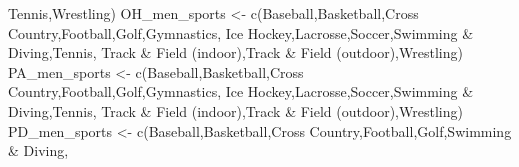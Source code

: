 \documentclass[
]{article}
\newenvironment{Shaded}{\begin{snugshade}}{\end{snugshade}}
\newcommand{\FunctionTok}[1]{\textcolor[rgb]{0.00,0.00,0.00}{#1}}
\newcommand{\NormalTok}[1]{#1}
\newcommand{\OtherTok}[1]{\textcolor[rgb]{0.56,0.35,0.01}{#1}}
\newcommand{\StringTok}[1]{\textcolor[rgb]{0.31,0.60,0.02}{#1}}
\begin{document}
\begin{Shaded}
\begin{Highlighting}[]
                   \StringTok{\textquotesingle{}Tennis\textquotesingle{}}\NormalTok{,}\StringTok{\textquotesingle{}Wrestling\textquotesingle{}}\NormalTok{)}
\NormalTok{OH\_men\_sports }\OtherTok{\textless{}{-}} \FunctionTok{c}\NormalTok{(}\StringTok{\textquotesingle{}Baseball\textquotesingle{}}\NormalTok{,}\StringTok{\textquotesingle{}Basketball\textquotesingle{}}\NormalTok{,}\StringTok{\textquotesingle{}Cross Country\textquotesingle{}}\NormalTok{,}\StringTok{\textquotesingle{}Football\textquotesingle{}}\NormalTok{,}\StringTok{\textquotesingle{}Golf\textquotesingle{}}\NormalTok{,}\StringTok{\textquotesingle{}Gymnastics\textquotesingle{}}\NormalTok{,}
                   \StringTok{\textquotesingle{}Ice Hockey\textquotesingle{}}\NormalTok{,}\StringTok{\textquotesingle{}Lacrosse\textquotesingle{}}\NormalTok{,}\StringTok{\textquotesingle{}Soccer\textquotesingle{}}\NormalTok{,}\StringTok{\textquotesingle{}Swimming \& Diving\textquotesingle{}}\NormalTok{,}\StringTok{\textquotesingle{}Tennis\textquotesingle{}}\NormalTok{,}
                   \StringTok{\textquotesingle{}Track \& Field (indoor)\textquotesingle{}}\NormalTok{,}\StringTok{\textquotesingle{}Track \& Field (outdoor)\textquotesingle{}}\NormalTok{,}\StringTok{\textquotesingle{}Wrestling\textquotesingle{}}\NormalTok{)}
\NormalTok{PA\_men\_sports }\OtherTok{\textless{}{-}} \FunctionTok{c}\NormalTok{(}\StringTok{\textquotesingle{}Baseball\textquotesingle{}}\NormalTok{,}\StringTok{\textquotesingle{}Basketball\textquotesingle{}}\NormalTok{,}\StringTok{\textquotesingle{}Cross Country\textquotesingle{}}\NormalTok{,}\StringTok{\textquotesingle{}Football\textquotesingle{}}\NormalTok{,}\StringTok{\textquotesingle{}Golf\textquotesingle{}}\NormalTok{,}\StringTok{\textquotesingle{}Gymnastics\textquotesingle{}}\NormalTok{,}
                   \StringTok{\textquotesingle{}Ice Hockey\textquotesingle{}}\NormalTok{,}\StringTok{\textquotesingle{}Lacrosse\textquotesingle{}}\NormalTok{,}\StringTok{\textquotesingle{}Soccer\textquotesingle{}}\NormalTok{,}\StringTok{\textquotesingle{}Swimming \& Diving\textquotesingle{}}\NormalTok{,}\StringTok{\textquotesingle{}Tennis\textquotesingle{}}\NormalTok{,}
                   \StringTok{\textquotesingle{}Track \& Field (indoor)\textquotesingle{}}\NormalTok{,}\StringTok{\textquotesingle{}Track \& Field (outdoor)\textquotesingle{}}\NormalTok{,}\StringTok{\textquotesingle{}Wrestling\textquotesingle{}}\NormalTok{)}
\NormalTok{PD\_men\_sports }\OtherTok{\textless{}{-}} \FunctionTok{c}\NormalTok{(}\StringTok{\textquotesingle{}Baseball\textquotesingle{}}\NormalTok{,}\StringTok{\textquotesingle{}Basketball\textquotesingle{}}\NormalTok{,}\StringTok{\textquotesingle{}Cross Country\textquotesingle{}}\NormalTok{,}\StringTok{\textquotesingle{}Football\textquotesingle{}}\NormalTok{,}\StringTok{\textquotesingle{}Golf\textquotesingle{}}\NormalTok{,}\StringTok{\textquotesingle{}Swimming \& Diving\textquotesingle{}}\NormalTok{,}

\end{Highlighting}
\end{Shaded}
\end{document}
